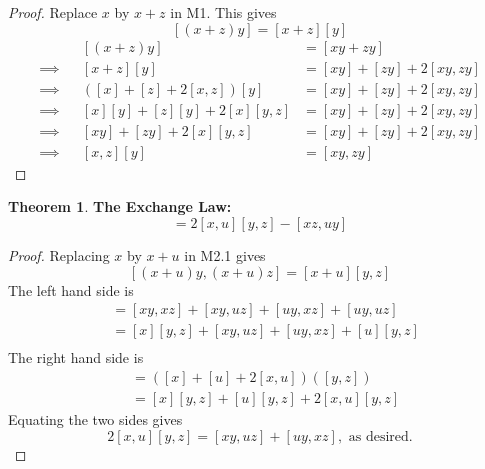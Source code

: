 \documentclass[11pt]{report}
\theoremstyle{plain}
\theoremstyle{definition}
\newtheorem{theorem}{Theorem}
\begin{document}
 \begin{proof}
 	Replace $ x $ by $ x+z $ in M1. This gives $$[(x+z)y]=[x+z][y] $$
 	\begin{align*}
 			&& [(x+z)y] &= [xy + zy]\\
 			\implies&& [x+z][y] &=[xy]+[zy]+2[xy,zy]\\
 			\implies&& ([x]+[z]+2[x,z])[y] &= [xy]+[zy]+2[xy,zy]\\
 			\implies&& [x][y] + [z][y] + 2[x][y,z] &= [xy] +[zy]+2[xy,zy]\\
 			\implies&& [xy] + [zy] + 2[x][y,z] &= [xy]+[zy]+2[xy,zy]\\
 			\implies&& [x,z][y]&=[xy,zy]  			
 	\end{align*}
 \end{proof}
 \begin{theorem}
 	\textbf{ The Exchange Law: }
 	\begin{equation}
 	[xy,uz] = 2[x,u][y,z] - [xz,uy] \tag{M3}\label{M3}
 	\end{equation}
 \end{theorem}
 \begin{proof}
 	Replacing $ x $ by $ x + u $ in M2.1 gives
 	$$ [(x+u)y,(x+u)z] = [x+u][y,z]$$
 	The left hand side is
 	\begin{align*}
 	[xy+uy,xz+uz] &= [xy,xz]+[xy,uz]+[uy,xz]+[uy,uz]\\
 	&= [x][y,z]+[xy,uz]+[uy,xz]+[u][y,z]\\
 	\end{align*}
 	The right hand side is
 	\begin{align*}
 		[x+u][y,z] &= ([x]+[u]+2[x,u])([y,z])\\
 		&=[x][y,z]+[u][y,z]+2[x,u][y,z]
 	\end{align*}
 	Equating the two sides gives $$ 2[x,u][y,z] = [xy,uz]+[uy,xz] , \text{ as desired.}$$
 \end{proof}
\end{document}
